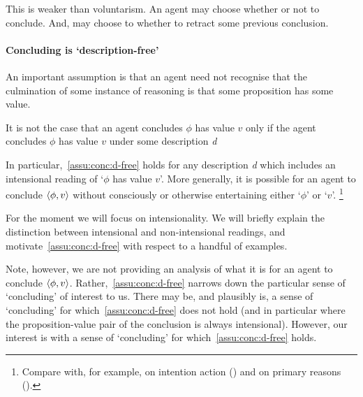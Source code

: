 \begin{note}
  This is weaker than voluntarism.
  An agent may choose whether or not to conclude.
  And, may choose to whether to retract some previous conclusion.
\end{note}

\paragraph*{Concluding is `description-free'}

\begin{note}[Descriptions]
  An important assumption is that an agent need not recognise that the culmination of some instance of reasoning is that some proposition has some value.

  \begin{assumption}
    \label{assu:conc:d-free}
    It is not the case that an agent concludes \(\phi\) has value \(v\) only if the agent concludes \(\phi\) has value \(v\) under some description \emph{d}
  \end{assumption}

  In particular,~\autoref{assu:conc:d-free} holds for any description \emph{d} which includes an intensional reading of `\(\phi\) has value \(v\)'.
  More generally, it is possible for an agent to conclude \(\langle \phi, v \rangle\) without consciously or otherwise entertaining either `\(\phi\)' or `\(v\)'.%
  \footnote{
    Compare with, for example, \citeauthor{Anscombe:1957aa} on intention action (\citeyear[\S19]{Anscombe:1957aa}) and \citeauthor{Davidson:1963aa} on primary reasons (\citeyear[5]{Davidson:1963aa}).
  }

  For the moment we will focus on intensionality.
  We will briefly explain the distinction between intensional and non-intensional readings, and motivate~\autoref{assu:conc:d-free} with respect to a handful of examples.

  Note, however, we are not providing an analysis of what it is for an agent to conclude \(\langle \phi, v \rangle\).
  Rather,~\autoref{assu:conc:d-free} narrows down the particular sense of `concluding' of interest to us.
  There may be, and plausibly is, a sense of `concluding' for which~\autoref{assu:conc:d-free} does not hold (and in particular where the proposition-value pair of the conclusion is always intensional).
  However, our interest is with a sense of `concluding' for which~\autoref{assu:conc:d-free} holds.
\end{note}

